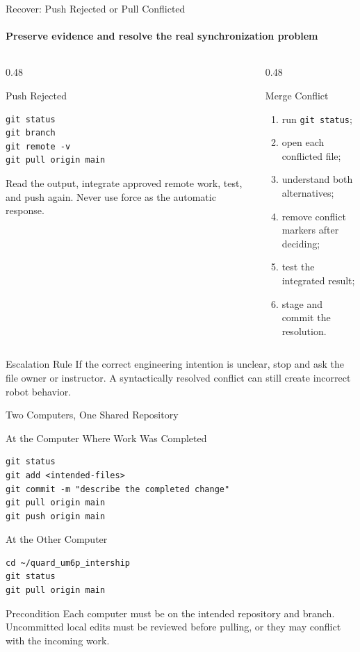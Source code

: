 \begin{frame}[fragile]{Recover: Push Rejected or Pull Conflicted}
\framesubtitle{Preserve evidence and resolve the real synchronization problem}
\scriptsize
\begin{columns}[T,onlytextwidth]
\begin{column}{0.48\textwidth}
\begin{block}{Push Rejected}
\begin{verbatim}
git status
git branch
git remote -v
git pull origin main
\end{verbatim}
Read the output, integrate approved remote work, test, and push again. Never use force as the automatic response.
\end{block}
\end{column}
\begin{column}{0.48\textwidth}
\begin{exampleblock}{Merge Conflict}
\begin{enumerate}\setlength{\itemsep}{0.15em}
\item run \texttt{git status};
\item open each conflicted file;
\item understand both alternatives;
\item remove conflict markers after deciding;
\item test the integrated result;
\item stage and commit the resolution.
\end{enumerate}
\end{exampleblock}
\end{column}
\end{columns}
\begin{alertblock}{Escalation Rule}
If the correct engineering intention is unclear, stop and ask the file owner or instructor. A syntactically resolved conflict can still create incorrect robot behavior.
\end{alertblock}
\end{frame}

\begin{frame}[fragile]{Two Computers, One Shared Repository}
\footnotesize
\begin{block}{At the Computer Where Work Was Completed}
\begin{verbatim}
git status
git add <intended-files>
git commit -m "describe the completed change"
git pull origin main
git push origin main
\end{verbatim}
\end{block}
\begin{exampleblock}{At the Other Computer}
\begin{verbatim}
cd ~/quard_um6p_intership
git status
git pull origin main
\end{verbatim}
\end{exampleblock}
\begin{alertblock}{Precondition}
Each computer must be on the intended repository and branch. Uncommitted local edits must be reviewed before pulling, or they may conflict with the incoming work.
\end{alertblock}
\end{frame}

